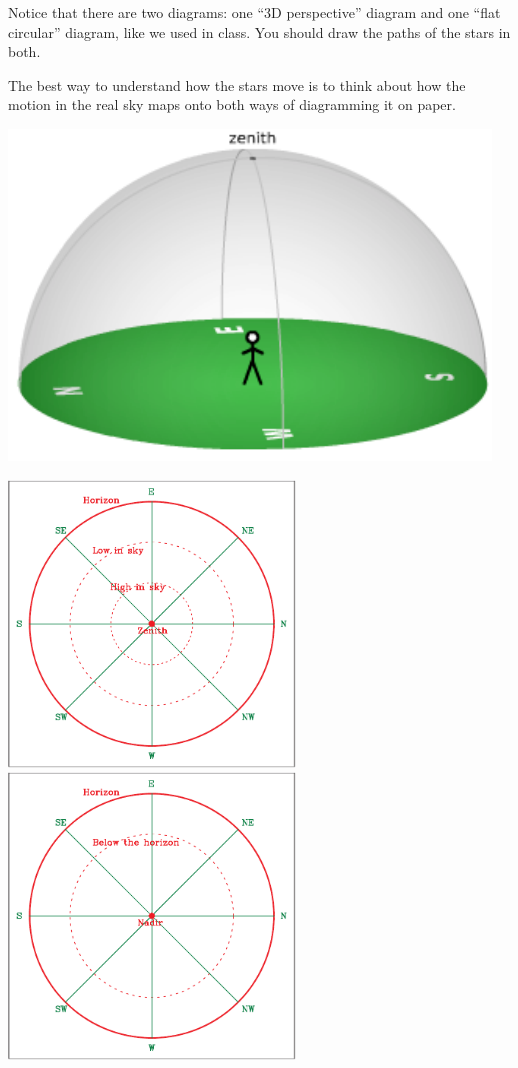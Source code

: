 \documentclass[11pt]{article}
\begin{document}
	Notice that there are two diagrams: one ``3D perspective'' diagram and one ``flat circular'' diagram, like we used in class. You should draw the paths of the stars in both.
	
	The best way to understand how the stars move is to think about how the motion in the real sky maps onto both ways of diagramming it on paper.
	
	
	
	

	\vspace*{1.5cm}
	
	\begin{center}
		\includegraphics{local_sky}
		
		\includegraphics[width=3in]{topsky-crop.pdf}
		\includegraphics[width=3in]{botsky-crop.pdf}
	\end{center}
	\newpage
	
\end{document}
